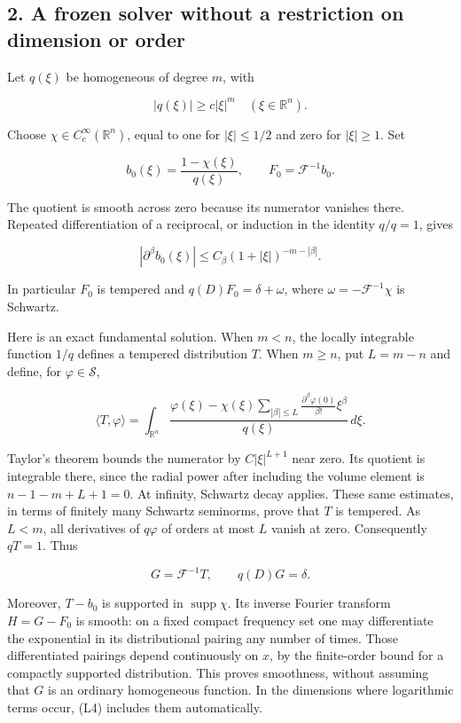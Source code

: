 \documentclass[
  11pt,
]{article}
\begin{document}
\subsection{2. A frozen solver without a restriction on dimension or
order}\label{a-frozen-solver-without-a-restriction-on-dimension-or-order}

Let \(q(\xi)\) be homogeneous of degree \(m\), with

\[
|q(\xi)|\geq c|\xi|^m\quad(\xi\in\mathbb R^n).                 \tag{L1}
\]

Choose \(\chi\in C_c^\infty(\mathbb R^n)\), equal to one for
\(|\xi|\leq1/2\) and zero for \(|\xi|\geq1\). Set

\[
b_0(\xi)=\frac{1-\chi(\xi)}{q(\xi)},\qquad F_0=\mathcal F^{-1}b_0.
                                                                    \tag{L2}
\]

The quotient is smooth across zero because its numerator vanishes there.
Repeated differentiation of a reciprocal, or induction in the identity
\(q/q=1\), gives

\[
|\partial^\beta b_0(\xi)|\leq C_\beta(1+|\xi|)^{-m-|\beta|}.
                                                                    \tag{L3}
\]

In particular \(F_0\) is tempered and \(q(D)F_0=\delta+\omega\), where
\(\omega=-\mathcal F^{-1}\chi\) is Schwartz.

Here is an exact fundamental solution. When \(m<n\), the locally
integrable function \(1/q\) defines a tempered distribution \(T\). When
\(m\geq n\), put \(L=m-n\) and define, for \(\varphi\in\mathcal S\),

\[
\langle T,\varphi\rangle=
\int_{\mathbb R^n}\frac{\displaystyle\varphi(\xi)-\chi(\xi)
  \sum_{|\beta|\leq L}\frac{\partial^\beta\varphi(0)}{\beta!}\xi^\beta}
 {q(\xi)}\,d\xi.                                                   \tag{L4}
\]

Taylor's theorem bounds the numerator by \(C|\xi|^{L+1}\) near zero. Its
quotient is integrable there, since the radial power after including the
volume element is \(n-1-m+L+1=0\). At infinity, Schwartz decay applies.
These same estimates, in terms of finitely many Schwartz seminorms,
prove that \(T\) is tempered. As \(L<m\), all derivatives of
\(q\varphi\) of orders at most \(L\) vanish at zero. Consequently
\(qT=1\). Thus

\[
G=\mathcal F^{-1}T,\qquad q(D)G=\delta.                            \tag{L5}
\]

Moreover, \(T-b_0\) is supported in \(\operatorname{supp}\chi\). Its
inverse Fourier transform \(H=G-F_0\) is smooth: on a fixed compact
frequency set one may differentiate the exponential in its
distributional pairing any number of times. Those differentiated
pairings depend continuously on \(x\), by the finite-order bound for a
compactly supported distribution. This proves smoothness, without
assuming that \(G\) is an ordinary homogeneous function. In the
dimensions where logarithmic terms occur, (L4) includes them
automatically.
\end{document}
